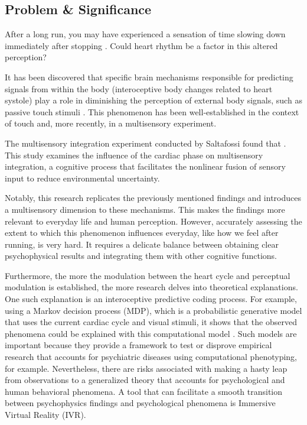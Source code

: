 \documentclass[12pt,oneside,openright]{report}
\begin{document}
\subsection*{Problem \& Significance}

After a long run, you may have experienced a sensation of time slowing down immediately after stopping \parencite{Edwards2017TimePP}. Could heart rhythm be a factor in this altered perception? 

It has been discovered that specific brain mechanisms responsible for predicting signals from within the body (interoceptive body changes related to heart systole) play a role in diminishing the perception of external body signals, such as passive touch stimuli \parencite{esra_p, Grund643, motyka}. This phenomenon has been well-established in the context of touch and, more recently, in a multisensory experiment.

The multisensory integration experiment conducted by Saltafossi found that \parencite{SALTAFOSSI2023108642}. This study examines the influence of the cardiac phase on multisensory integration, a cognitive process that facilitates the nonlinear fusion of sensory input to reduce environmental uncertainty.

Notably, this research replicates the previously mentioned findings and introduces a multisensory dimension to these mechanisms. This makes the findings more relevant to everyday life and human perception. However, accurately assessing the extent to which this phenomenon influences everyday, like how we feel after running, is very hard. It requires a delicate balance between obtaining clear psychophysical results and integrating them with other cognitive functions.

Furthermore, the more the modulation between the heart cycle and perceptual modulation is established, the more research delves into theoretical explanations. One such explanation is an interoceptive predictive coding process. For example, using a Markov decision process (MDP), which is a probabilistic generative model that uses the current cardiac cycle and visual stimuli, it shows that the observed phenomena could be explained with this computational model \parencite{Allen2022}. Such models are important because they provide a framework to test or disprove empirical research that accounts for psychiatric diseases using computational phenotyping, for example. Nevertheless, there are risks associated with making a hasty leap from observations to a generalized theory that accounts for psychological and human behavioral phenomena. A tool that can facilitate a smooth transition between psychophysics findings and psychological phenomena is Immersive Virtual Reality (IVR).
\end{document}
